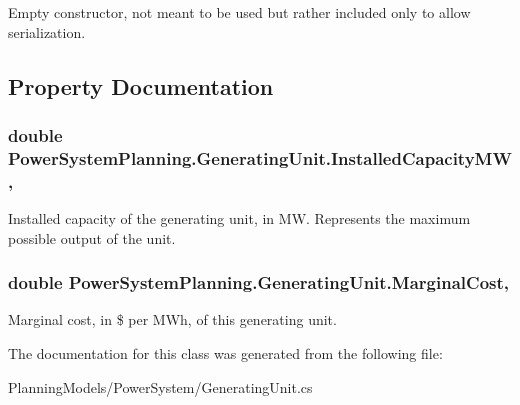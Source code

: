 Empty constructor, not meant to be used but rather included only to allow serialization. 



\subsection{Property Documentation}
\subsubsection[{\texorpdfstring{Installed\+Capacity\+MW}{InstalledCapacityMW}}]{\setlength{\rightskip}{0pt plus 5cm}double Power\+System\+Planning.\+Generating\+Unit.\+Installed\+Capacity\+MW\hspace{0.3cm}{\ttfamily [get]}, {\ttfamily [set]}}\hypertarget{class_power_system_planning_1_1_generating_unit_a85c9d9099840f3238ca341dd313b56f4}{}\label{class_power_system_planning_1_1_generating_unit_a85c9d9099840f3238ca341dd313b56f4}


Installed capacity of the generating unit, in MW. Represents the maximum possible output of the unit. 

\subsubsection[{\texorpdfstring{Marginal\+Cost}{MarginalCost}}]{\setlength{\rightskip}{0pt plus 5cm}double Power\+System\+Planning.\+Generating\+Unit.\+Marginal\+Cost\hspace{0.3cm}{\ttfamily [get]}, {\ttfamily [set]}}\hypertarget{class_power_system_planning_1_1_generating_unit_aec21179f99b2060e9c30ca59b0beab44}{}\label{class_power_system_planning_1_1_generating_unit_aec21179f99b2060e9c30ca59b0beab44}


Marginal cost, in \$ per M\+Wh, of this generating unit. 



The documentation for this class was generated from the following file\+:\begin{DoxyCompactItemize}
\item 
Planning\+Models/\+Power\+System/Generating\+Unit.\+cs\end{DoxyCompactItemize}
